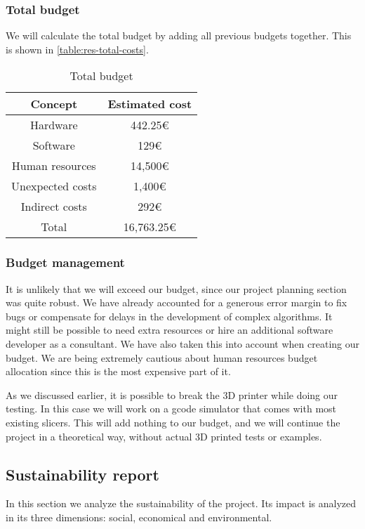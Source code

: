 \subsubsection{Total budget}
We will calculate the total budget by adding all previous budgets together. This is shown in \autoref{table:res-total-costs}.

\begin{table}[h!]
\centering
\begin{tabular}{ |c|c| } 
    \hline
    Concept & Estimated cost \\
    \hline
    \hline
    Hardware & 442.25€ \\
    \hline
    Software & 129€ \\
    \hline
    Human resources & 14,500€ \\
    \hline
    Unexpected costs & 1,400€ \\
    \hline
    Indirect costs & 292€ \\
    \hline
    \hline
    Total & 16,763.25€ \\
    \hline
\end{tabular}
\caption{Total budget}\label{table:res-total-costs}
\end{table}

\subsubsection{Budget management}
It is unlikely that we will exceed our budget, since our project planning section was quite robust. We have already accounted for a generous error margin to fix bugs or compensate for delays in the development of complex algorithms. It might still be possible to need extra resources or hire an additional software developer as a consultant. We have also taken this into account when creating our budget. We are being extremely cautious about human resources budget allocation since this is the most expensive part of it.

As we discussed earlier, it is possible to break the 3D printer while doing our testing. In this case we will work on a gcode simulator that comes with most existing slicers. This will add nothing to our budget, and we will continue the project in a theoretical way, without actual 3D printed tests or examples.



\subsection{Sustainability report}
In this section we analyze the sustainability of the project. Its impact is analyzed in its three dimensions: social, economical and environmental.



